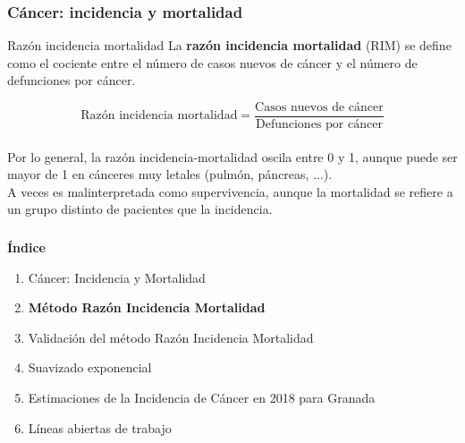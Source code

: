\documentclass{beamer}
\begin{document}
\begin{frame}\frametitle{Cáncer: incidencia y mortalidad}
	\begin{block}{Razón incidencia mortalidad}
		La \textbf{razón incidencia mortalidad} (RIM) se define como el cociente entre el número de casos nuevos de cáncer y el número de defunciones por cáncer.
		
		\vspace{0pt}
		$$\text{Razón incidencia mortalidad} = \frac{\text{Casos nuevos de cáncer}}{\text{Defunciones por cáncer}}$$ \\[1ex]
		
		Por lo general, la razón incidencia-mortalidad oscila entre 0 y 1, aunque puede ser mayor de 1 en cánceres muy letales (pulmón, páncreas, ...).\\[2ex]
		
		A veces es malinterpretada como supervivencia, aunque la mortalidad se refiere a un grupo distinto de pacientes que la incidencia.
	\end{block}

\end{frame}

\begin{frame}\frametitle{}

\Large{\textbf{Índice}}\\[2ex]
\normalsize
\begin{enumerate}
	\item Cáncer: Incidencia y Mortalidad \\[2ex]
	\item \textbf{Método Razón Incidencia Mortalidad} \\[2ex]
	\item Validación del método Razón Incidencia Mortalidad \\[2ex]
	\item Suavizado exponencial \\[2ex]
	\item  Estimaciones de la Incidencia de Cáncer en 2018 para Granada \\[2ex]
	\item Líneas abiertas de trabajo
\end{enumerate}

\end{frame}

\end{document}
